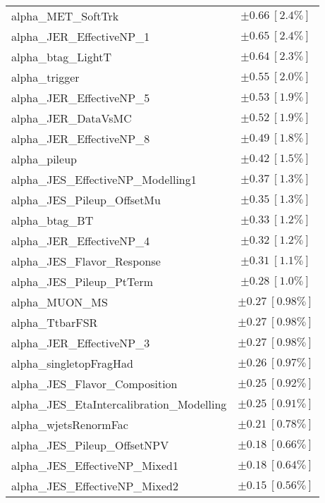 \begin{table}
\begin{center}
\begin{tabular*}{\textwidth}{@{\extracolsep{\fill}}lc}
alpha\_MET\_SoftTrk         & $\pm 0.66\ [2.4\%] $       \\
alpha\_JER\_EffectiveNP\_1         & $\pm 0.65\ [2.4\%] $       \\
alpha\_btag\_LightT         & $\pm 0.64\ [2.3\%] $       \\
alpha\_trigger         & $\pm 0.55\ [2.0\%] $       \\
alpha\_JER\_EffectiveNP\_5         & $\pm 0.53\ [1.9\%] $       \\
alpha\_JER\_DataVsMC         & $\pm 0.52\ [1.9\%] $       \\
alpha\_JER\_EffectiveNP\_8         & $\pm 0.49\ [1.8\%] $       \\
alpha\_pileup         & $\pm 0.42\ [1.5\%] $       \\
alpha\_JES\_EffectiveNP\_Modelling1         & $\pm 0.37\ [1.3\%] $       \\
alpha\_JES\_Pileup\_OffsetMu         & $\pm 0.35\ [1.3\%] $       \\
alpha\_btag\_BT         & $\pm 0.33\ [1.2\%] $       \\
alpha\_JER\_EffectiveNP\_4         & $\pm 0.32\ [1.2\%] $       \\
alpha\_JES\_Flavor\_Response         & $\pm 0.31\ [1.1\%] $       \\
alpha\_JES\_Pileup\_PtTerm         & $\pm 0.28\ [1.0\%] $       \\
alpha\_MUON\_MS         & $\pm 0.27\ [0.98\%] $       \\
alpha\_TtbarFSR         & $\pm 0.27\ [0.98\%] $       \\
alpha\_JER\_EffectiveNP\_3         & $\pm 0.27\ [0.98\%] $       \\
alpha\_singletopFragHad         & $\pm 0.26\ [0.97\%] $       \\
alpha\_JES\_Flavor\_Composition         & $\pm 0.25\ [0.92\%] $       \\
alpha\_JES\_EtaIntercalibration\_Modelling         & $\pm 0.25\ [0.91\%] $       \\
alpha\_wjetsRenormFac         & $\pm 0.21\ [0.78\%] $       \\
alpha\_JES\_Pileup\_OffsetNPV         & $\pm 0.18\ [0.66\%] $       \\
alpha\_JES\_EffectiveNP\_Mixed1         & $\pm 0.18\ [0.64\%] $       \\
alpha\_JES\_EffectiveNP\_Mixed2         & $\pm 0.15\ [0.56\%] $       \\

\end{tabular*}
\end{center}
\end{table}
